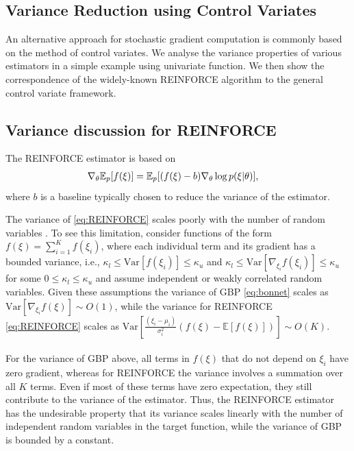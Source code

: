 \documentclass{article}
\newcommand{\E}{\mathbb{E}} %
\begin{document}
\begin{bibunit}[icml2013]
\section{Variance Reduction using Control Variates}
 \label{ap:var_reinforce}
An alternative approach for stochastic gradient computation is commonly 
based on the method of control variates. We analyse the variance properties 
of various estimators in a simple example using univariate function. We then 
show the correspondence of the widely-known REINFORCE algorithm to the 
general control variate framework.

 \subsection{Variance discussion for REINFORCE}

 The REINFORCE estimator is based on
 \begin{align}
 \nabla_{\theta} \E_p [ f(\xi) ] &= \E_p [ ( f(\xi) - b ) \nabla _{\theta} \log 
 p(\xi | \theta)  ], 
 \label{eq:REINFORCE}
 \vspace{-2mm}
 \end{align}
 where $b$ is a baseline typically chosen to reduce the variance of the 
 estimator. 
 
The variance of 
 \eqref{eq:REINFORCE}  scales poorly 
 with the number of random variables \citep{dayan1995}. To see this 
 limitation, consider functions of the form $ f(\xi) = \sum_{i=1}^K f(\xi_i)$, 
 where 
 each individual term and its gradient has a bounded variance, i.e., $ 
 \kappa_l 
 \leq 
 \textrm{Var}[f(\xi_i)] \leq \kappa_u $ and $ \kappa_l \leq 
 \textrm{Var}[\nabla_{\xi_i}f(\xi_i)] \leq \kappa_u $ for some $0\leq 
 \kappa_{l} 
 \leq \kappa_u$ and assume 
 independent or weakly 
 correlated random variables. Given these assumptions the variance of GBP
 \eqref{eq:bonnet} scales as $ \textrm{Var}[ \nabla_{\xi_i} f(\xi) ] \sim O(1) 
 \label{eq:varGBPMuM} $, while the variance for REINFORCE 
 \eqref{eq:REINFORCE} scales as $  \textrm{Var}\left[  \frac{( \xi_i - \mu_i )}{ 
 	\sigma_i^2 } ( f(\xi) - \E[ f(\xi)   ] ) \right] \sim  O(K). 
 \label{eq:varPolGradMuM} $
 \\ \\
 For the variance of GBP above, all terms in $f(\xi)$ that do not 
 depend on $\xi_i$ have zero gradient, whereas for REINFORCE
 the variance involves a summation over all $K$ terms. Even if 
 most of these terms have zero expectation, they still contribute to the 
 variance of 
 the estimator. Thus, the REINFORCE estimator has the undesirable property 
 that its variance scales linearly with the number of independent random 
 variables in the target function, while the variance of GBP is bounded by a 
 constant. 


\end{bibunit}
\end{document}
